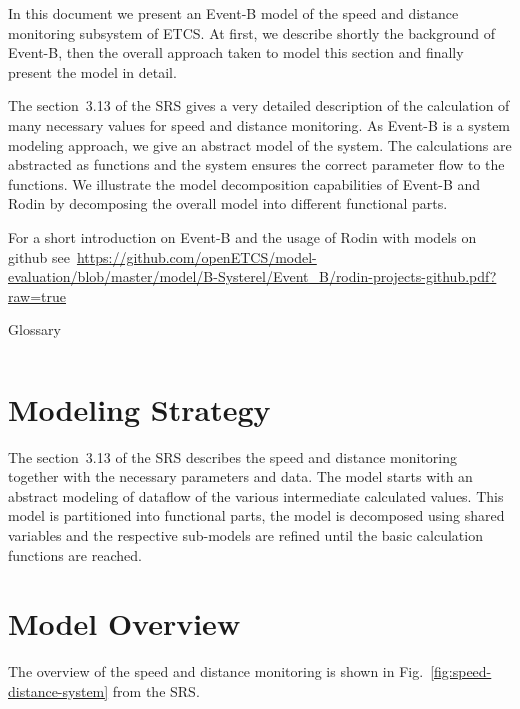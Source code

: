 \documentclass{template/openetcs_article}
\begin{document}
In this document we present an Event-B model of the speed and distance
monitoring subsystem of ETCS. At first, we describe shortly the background of
Event-B, then the overall approach taken to model this section and finally
present the model in detail.

The section~3.13 of the SRS gives a very detailed description of the calculation
of many necessary values for speed and distance monitoring. As Event-B is a
system modeling approach, we give an abstract model of the system. The
calculations are abstracted as functions and the system ensures the correct
parameter flow to the functions. We illustrate the model decomposition
capabilities of Event-B and Rodin by decomposing the overall model into
different functional parts.

For a short introduction on Event-B and the usage of Rodin with models on github
see~\url{https://github.com/openETCS/model-evaluation/blob/master/model/B-Systerel/Event_B/rodin-projects-github.pdf?raw=true}

\begin{table}[ht]
  \centering
  \begin{tabular}[ht]{|l|l|}
    \hline
     &  \\
    \hline
  \end{tabular}
  \caption{Glossary}
  \label{tab:glossary}
\end{table}

\section{Modeling Strategy}
\label{sec:modeling-strategy}

The section~3.13 of the SRS describes the speed and distance monitoring together
with the necessary parameters and data. The model starts with an abstract
modeling of dataflow of the various intermediate calculated values. This model
is partitioned into functional parts, the model is decomposed using shared
variables and the respective sub-models are refined until the basic calculation
functions are reached.

\section{Model Overview}
\label{sec:model-overview}

The overview of the speed and distance monitoring is shown in
Fig.~\ref{fig:speed-distance-system} from the SRS.
\end{document}
